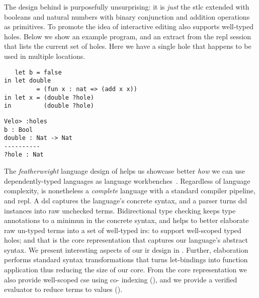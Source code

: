 The design behind \Velo{} is purposefully unsurprising:
%
it is \emph{just} the \ac{stlc} extended with booleans and natural numbers with binary conjunction and addition operations as primitives.
%
To promote the idea of interactive editing \Velo{} also supports well-typed holes.
%
Below we show an example \Velo{} program, and an extract from the \acs*{repl}
session that lists the current set of holes. Here we have a single hole that
happens to be used in multiple locations.

\begin{center}
  \begin{minipage}[t]{0.45\linewidth}
\begin{Verbatim}
   let b = false
in let double
         = (fun x : nat => (add x x))
in let x = (double ?hole)
in         (double ?hole)
\end{Verbatim}
\end{minipage}
\hfill
  \begin{minipage}[t]{0.45\linewidth}
    \begin{Verbatim}
Velo> :holes
b : Bool
double : Nat -> Nat
----------
?hole : Nat
\end{Verbatim}
\end{minipage}

\end{center}

The \emph{featherweight} language design of \Velo{} helps us showcase better \emph{how} we can use dependently-typed languages as language workbenches~\cite{DBLP:journals/toplas/IgarashiPW01}.
%
Regardless of language complexity, \Velo{} is nonetheless a \emph{complete} language with a standard compiler pipeline, and \acs*{repl}.
%
A \ac{dsl} captures the language's concrete syntax, and a parser turns \ac{dsl} instances into raw unchecked terms.
%
Bidirectional type checking keeps type annotations to a minimun in the concrete syntax, and helps to better elaborate raw un-typed terms into a set of well-typed \acp{ir}:
%
 to support well-scoped typed holes;
%
and
%
 that is the core representation that captures our language's abstract syntax.
%
We present interesting aspects of our \ac{ir} design in .
%
Further, elaboration performs standard syntax transformations that turns let-bindings into function application thus reducing the size of our core.
%
From the core representation we also provide well-scoped \ac{cse} using co-\DeBruijn{} indexing (), and we provide a verified evaluator to reduce terms to values ().



